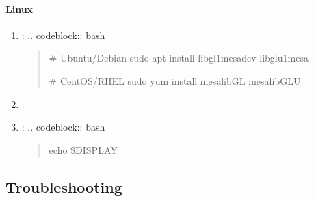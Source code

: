 \documentclass[a4paper,10pt,english,openany,oneside]{sphinxmanual}
\begin{document}
\paragraph{Linux}
\label{\detokenize{legacy_examples:linux}}\begin{enumerate}
%
\item {} 
\sphinxAtStartPar
{}:
.. code\sphinxhyphen{}block:: bash
\begin{quote}

\sphinxAtStartPar
\# Ubuntu/Debian
sudo apt install libgl1\sphinxhyphen{}mesa\sphinxhyphen{}dev libglu1\sphinxhyphen{}mesa

\sphinxAtStartPar
\# CentOS/RHEL
sudo yum install mesa\sphinxhyphen{}libGL mesa\sphinxhyphen{}libGLU
\end{quote}

\item {} 
\sphinxAtStartPar
{}

\item {} 
\sphinxAtStartPar
{}:
.. code\sphinxhyphen{}block:: bash
\begin{quote}

\sphinxAtStartPar
echo \$DISPLAY
\end{quote}

\end{enumerate}


\subsection{Troubleshooting}
\label{\detokenize{legacy_examples:troubleshooting}}
\end{document}
